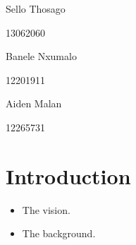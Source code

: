 \documentclass{article}
\begin{document}
\begin{titlepage}
\begin{center}
			\begin{minipage}{0.4\textwidth}
				\begin{flushleft} \large
					Sello {Thosago}
				\end{flushleft}
			\end{minipage}
			\begin{minipage}{0.4\textwidth}
				\begin{flushright} \large
					\emph{}
					13062060
				\end{flushright}
			\end{minipage}
			
			\begin{minipage}{0.4\textwidth}
				\begin{flushleft} \large
					Banele {Nxumalo}
				\end{flushleft}
			\end{minipage}
			\begin{minipage}{0.4\textwidth}
				\begin{flushright} \large
					\emph{}
					12201911
				\end{flushright}
			\end{minipage}
			
			\begin{minipage}{0.4\textwidth}
				\begin{flushleft} \large
					Aiden {Malan}
				\end{flushleft}
			\end{minipage}
			\begin{minipage}{0.4\textwidth}
				\begin{flushright} \large
					\emph{}
					12265731
				\end{flushright}
			\end{minipage}
			
			
			\vfill
			
		\end{center}
	\end{titlepage}
	\footnotesize
	\normalsize
	
	
	\tableofcontents
	\newpage
	
	\newpage %
	\section{Introduction} 
	\begin{itemize} 
		\item The vision.
		\item The background.
	\end{itemize}
	
\end{document}

